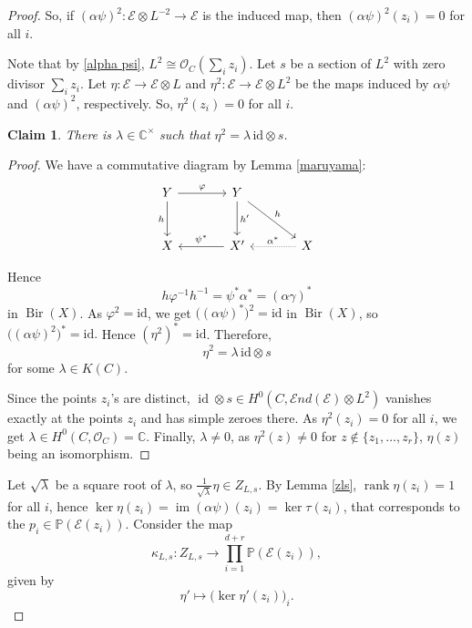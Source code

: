 \documentclass[11pt,letterpaper]{amsart}
\newtheorem{claim}[lemma]{Claim}
\begin{document}
\begin{proof}
So, if $(\alpha\psi)^2:\mathcal{E}\otimes L^{-2}\to\mathcal{E}$ is the induced map, then $(\alpha\psi)^2(z_i)=0$
for all $i$.

Note that by \eqref{alpha psi}, $L^{2}\cong\mathcal{O}_C\!\left(\sum_i z_i\right).$
Let $s$ be a section of $L^2$ with zero divisor $\sum_i z_i$. Let
$\eta:\mathcal{E}\to\mathcal{E}\otimes L$ and
$\eta^2:\mathcal{E}\to\mathcal{E}\otimes L^2$
be the maps induced by $\alpha\psi$ and $(\alpha\psi)^2$, respectively.
So, $\eta^2(z_i)=0$ for all $i$.

\begin{claim}

There is $\lambda\in\mathbb{C}^{\times}$ such that
$\eta^2=\lambda\,\mathrm{id}\otimes s$.
    
\end{claim}

\begin{proof}
We have a commutative diagram by Lemma \ref{maruyama}:
\[
\begin{tikzcd}[column sep=large,row sep=large]
Y \arrow[r,"\varphi"] \arrow[d,"h"'] &
Y \arrow[d,"h'"] \arrow[dr,"h"] & \\
X &
X' \arrow[l,"\psi^*"'] &
X \arrow[l,densely dotted,"\alpha^*"']
\end{tikzcd}
\]

Hence
\[
h\varphi^{-1}h^{-1}
=
\psi^*\alpha^*
=
(\alpha\gamma)^*
\] in $\operatorname{Bir}(X)$. As $\varphi^2=\mathrm{id}$, we get $\bigl((\alpha\psi)^*\bigr)^2=\mathrm{id}$ in $\operatorname{Bir}(X)$,
so $\bigl((\alpha\psi)^2\bigr)^*=\mathrm{id}.$ Hence $(\eta^2)^*=\mathrm{id}$. Therefore,
\[
\eta^2=\lambda\,\mathrm{id}\otimes s
\]
for some $\lambda\in K(C)$.

Since the points $z_i$'s are distinct, $\operatorname{id}\otimes s \in H^0(C,\mathcal{E}nd(\mathcal{E})\otimes L^2)$ vanishes exactly at the points $z_i$ and has simple zeroes there. As $\eta^2(z_i)=0$ for all $i$, we get $\lambda\in H^0(C,\mathcal{O}_C)=\mathbb{C}$. Finally, $\lambda\neq 0$, as $\eta^2(z)\neq 0$ for $z\notin\{z_1,\ldots,z_r\}$, $\eta(z)$ being an isomorphism.
\end{proof}

Let $\sqrt{\lambda}$ be a square root of $\lambda$, so $\frac{1}{\sqrt{\lambda}}\eta\in Z_{L,s}$. By Lemma \ref{zls}, $\operatorname{rank}\eta(z_i)=1$ for all $i$, hence $\ker\eta(z_i)=\operatorname{im}(\alpha\psi)(z_i)=\ker\tau(z_i)$, that corresponds to the $p_i\in\mathbb{P}(\mathcal{E}(z_i))$. Consider the map
\[
\kappa_{L,s}: Z_{L,s}\longrightarrow \prod_{i=1}^{d+r}\mathbb{P}(\mathcal{E}(z_i)),
\]
given by
\[
\eta'\longmapsto \bigl(\ker\eta'(z_i)\bigr)_i.
\]


\end{proof}
\end{document}

